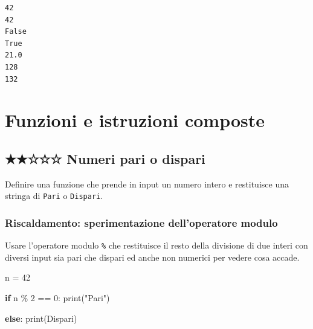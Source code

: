 \documentclass[
  letterpaper,
]{scrbook}
\newenvironment{Shaded}{\begin{snugshade}}{\end{snugshade}}
\newcommand{\BuiltInTok}[1]{\textcolor[rgb]{0.00,0.23,0.31}{#1}}
\newcommand{\ControlFlowTok}[1]{\textcolor[rgb]{0.00,0.23,0.31}{\textbf{#1}}}
\newcommand{\DecValTok}[1]{\textcolor[rgb]{0.68,0.00,0.00}{#1}}
\newcommand{\NormalTok}[1]{\textcolor[rgb]{0.00,0.23,0.31}{#1}}
\newcommand{\OperatorTok}[1]{\textcolor[rgb]{0.37,0.37,0.37}{#1}}
\newcommand{\StringTok}[1]{\textcolor[rgb]{0.13,0.47,0.30}{#1}}
\begin{document}
\begin{verbatim}
42
42
False
True
21.0
128
132
\end{verbatim}

\section{Funzioni e istruzioni
composte}\label{funzioni-e-istruzioni-composte}

\subsection{★★☆☆☆ Numeri pari o dispari}\label{numeri-pari-o-dispari}

Definire una funzione che prende in input un numero intero e restituisce
una stringa di \texttt{Pari} o \texttt{Dispari}.

\subsubsection{Riscaldamento: sperimentazione dell'operatore
modulo}\label{riscaldamento-sperimentazione-delloperatore-modulo}

\begin{tcolorbox}[enhanced jigsaw, leftrule=.75mm, arc=.35mm, opacityback=0, rightrule=.15mm, titlerule=0mm, colbacktitle=quarto-callout-tip-color!10!white, colback=white, colframe=quarto-callout-tip-color-frame, bottomrule=.15mm, toprule=.15mm, bottomtitle=1mm, toptitle=1mm, title=\textcolor{quarto-callout-tip-color}{\faLightbulb}\hspace{0.5em}{Suggerimento}, breakable, coltitle=black, opacitybacktitle=0.6, left=2mm]

Usare l'operatore modulo \texttt{\%} che restituisce il resto della
divisione di due interi con diversi input sia pari che dispari ed anche
non numerici per vedere cosa accade.

\end{tcolorbox}

\begin{Shaded}
\begin{Highlighting}[]
\NormalTok{n }\OperatorTok{=} \DecValTok{42}

\ControlFlowTok{if}\NormalTok{ n }\OperatorTok{\%} \DecValTok{2} \OperatorTok{==} \DecValTok{0}\NormalTok{:}
  \BuiltInTok{print}\NormalTok{(}\StringTok{"Pari"}\NormalTok{)}

\ControlFlowTok{else}\NormalTok{:}
  \BuiltInTok{print}\NormalTok{(Dispari)}
\end{Highlighting}
\end{Shaded}
\end{document}
